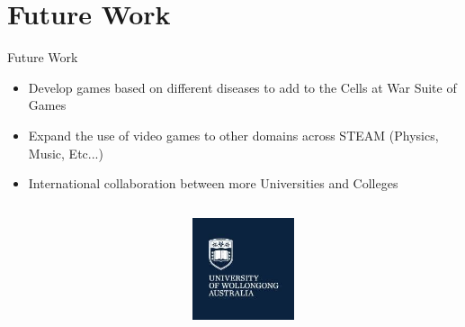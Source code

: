 \documentclass{beamer}
\begin{document}
	\section{Future Work}
	\begin{frame}{Future Work}
		\begin{itemize}
			\item Develop games based on different diseases to add to the Cells at War Suite of Games
			\item Expand the use of video games to other domains across STEAM (Physics, Music, Etc...)
			\item International collaboration between more Universities and Colleges	
		\end{itemize}
	\begin{columns}
		\begin{column}{0.4\textwidth}
		\end{column}
		\begin{column}{0.3\textwidth}
			\includegraphics[width=3cm,height=3cm]{wgong.jpeg}
		\end{column}
	\end{columns}	

	\end{frame}
	
\end{document}
